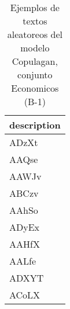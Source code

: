\begin{table}[H]
\centering
\fontsize{8}{14}\selectfont
\caption{Ejemplos de textos aleatoreos del modelo Copulagan, conjunto Economicos (B-1)}
\label{table-sample10-economicos-b-1-copulagan-text}
\begin{tabular}{|m{50em}|}
\hline
\rowcolor[gray]{0.8}
description \\
\hline ADzXt \\
\hline AAQse \\
\hline AAWJv \\
\hline ABCzv \\
\hline AAhSo \\
\hline ADyEx \\
\hline AAHfX \\
\hline AALfe \\
\hline ADXYT \\
\hline ACoLX \\
\hline
\end{tabular}
\end{table}
